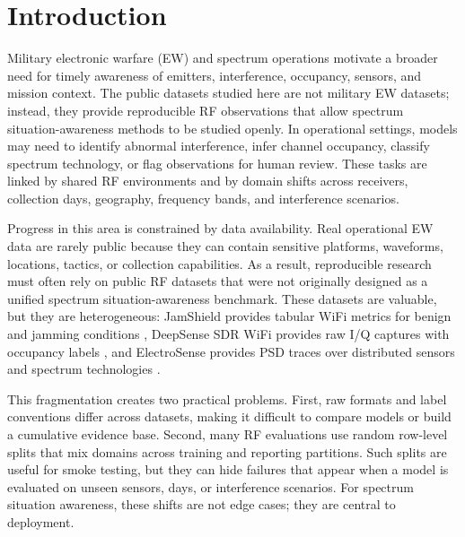 \documentclass{ieeeaccess}
\begin{document}
\titlepgskip=-15pt
\maketitle

\section{Introduction}

Military electronic warfare (EW) and spectrum operations motivate a broader need for timely awareness of emitters, interference, occupancy, sensors, and mission context. The public datasets studied here are not military EW datasets; instead, they provide reproducible RF observations that allow spectrum situation-awareness methods to be studied openly. In operational settings, models may need to identify abnormal interference, infer channel occupancy, classify spectrum technology, or flag observations for human review. These tasks are linked by shared RF environments and by domain shifts across receivers, collection days, geography, frequency bands, and interference scenarios.

Progress in this area is constrained by data availability. Real operational EW data are rarely public because they can contain sensitive platforms, waveforms, locations, tactics, or collection capabilities. As a result, reproducible research must often rely on public RF datasets that were not originally designed as a unified spectrum situation-awareness benchmark. These datasets are valuable, but they are heterogeneous: JamShield provides tabular WiFi metrics for benign and jamming conditions \cite{panitsas2025jamshield,panitsas2024jamshieldDatasetGithub,panitsas2024jamshieldDatasetDataport}, DeepSense SDR WiFi provides raw I/Q captures with occupancy labels \cite{uvaydov2021deepsense,wiotlab2021deepsenseGithub}, and ElectroSense provides PSD traces over distributed sensors and spectrum technologies \cite{scalingi2023wirelessTechnologyClassification,scalingi2023electrosensePsdDataset,rajendran2017electrosenseOpenBig}.

This fragmentation creates two practical problems. First, raw formats and label conventions differ across datasets, making it difficult to compare models or build a cumulative evidence base. Second, many RF evaluations use random row-level splits that mix domains across training and reporting partitions. Such splits are useful for smoke testing, but they can hide failures that appear when a model is evaluated on unseen sensors, days, or interference scenarios. For spectrum situation awareness, these shifts are not edge cases; they are central to deployment.
\end{document}
